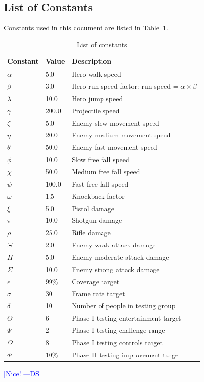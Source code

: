 \documentclass[12pt, titlepage]{article}
\newcommand{\authornote}[3]{\textcolor{#1}{[#3 ---#2]}}
\newcommand{\authornote}[3]{}
\newcommand{\ds}[1]{\authornote{blue}{DS}{#1}}
\begin{document}
\subsection{List of Constants}
Constants used in this document are listed in \hyperref[tab:constants]{Table~\ref*{tab:constants}}.
\begin{table}[ht]
\caption{List of constants} \label{tab:constants}
\begin{tabularx}{\textwidth}{p{3cm}p{2cm}X}
\toprule {\bf Constant} & {\bf Value} & {\bf Description}\\
\midrule
$\alpha$ & 5.0 & Hero walk speed\\
$\beta$ & 3.0 & Hero run speed factor: run speed = $\alpha \times \beta$\\
$\lambda$ & 10.0 & Hero jump speed\\ 
$\gamma$ & 200.0 & Projectile speed\\
$\zeta$ & 5.0 & Enemy slow movement speed\\
$\eta$ & 20.0 & Enemy medium movement speed\\
$\theta$ & 50.0 & Enemy fast movement speed\\
$\phi$ & 10.0 & Slow free fall speed\\
$\chi$ & 50.0 & Medium free fall speed\\
$\psi$ & 100.0 & Fast free fall speed\\
$\omega$ & 1.5 & Knockback factor\\
$\xi$ & 5.0 & Pistol damage\\
$\pi$ & 10.0 & Shotgun damage\\
$\rho$ & 25.0 & Rifle damage\\
$\Xi$ & 2.0 & Enemy weak attack damage\\
$\Pi$ & 5.0 & Enemy moderate attack damage\\
$\Sigma$ & 10.0 & Enemy strong attack damage\\
$\epsilon$ & 99\% & Coverage target\\
$\sigma$ & 30 & Frame rate target\\
$\delta$ & 10 & Number of people in testing group\\
$\Theta$ & 6 & Phase I testing entertainment target\\
$\Psi$ & 2 & Phase I testing challenge range\\
$\Omega$ & 8 & Phase I testing controls target\\
$\Phi$ & 10\% & Phase II testing improvement target\\

\bottomrule
\end{tabularx}
\end{table}
\ds{Nice!}
\end{document}
